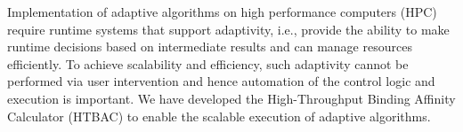 

 



Implementation of adaptive algorithms on high performance computers (HPC)
require runtime systems that support adaptivity, i.e., provide the ability to
make runtime decisions based on intermediate results and can manage resources
efficiently. To achieve scalability and efficiency, such adaptivity cannot be
performed via user intervention and hence automation of the control logic and
execution is important. We have developed the High-Throughput Binding Affinity
Calculator (HTBAC) to enable the scalable execution of adaptive algorithms.


